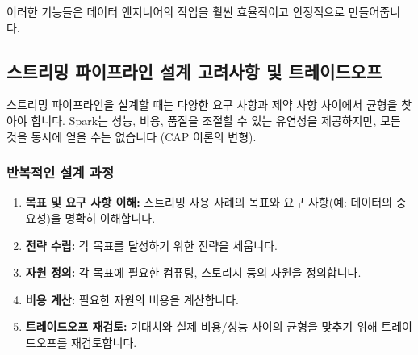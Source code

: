 \documentclass[11pt,a4paper]{article}
\theoremstyle{definition}
\begin{document}
이러한 기능들은 데이터 엔지니어의 작업을 훨씬 효율적이고 안정적으로 만들어줍니다.

\subsection{스트리밍 파이프라인 설계 고려사항 및 트레이드오프}

스트리밍 파이프라인을 설계할 때는 다양한 요구 사항과 제약 사항 사이에서 균형을 찾아야 합니다. Spark는 성능, 비용, 품질을 조절할 수 있는 유연성을 제공하지만, 모든 것을 동시에 얻을 수는 없습니다 (CAP 이론의 변형).

\subsubsection{반복적인 설계 과정}
\begin{enumerate}
    \item \textbf{목표 및 요구 사항 이해:} 스트리밍 사용 사례의 목표와 요구 사항(예: 데이터의 중요성)을 명확히 이해합니다.
    \item \textbf{전략 수립:} 각 목표를 달성하기 위한 전략을 세웁니다.
    \item \textbf{자원 정의:} 각 목표에 필요한 컴퓨팅, 스토리지 등의 자원을 정의합니다.
    \item \textbf{비용 계산:} 필요한 자원의 비용을 계산합니다.
    \item \textbf{트레이드오프 재검토:} 기대치와 실제 비용/성능 사이의 균형을 맞추기 위해 트레이드오프를 재검토합니다.
\end{enumerate}
\end{document}
